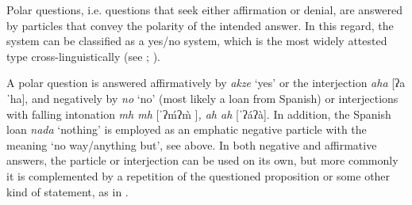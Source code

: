 \documentclass[output=paper,colorlinks,citecolor=brown]{langscibook}
\begin{document}
Polar questions, i.e. questions that seek either affirmation or denial, are answered by particles that convey the polarity of the intended answer. In this regard, the system can be classified as a yes/no system, which is the most widely attested type cross-linguistically (see \citealt{Moser2018}; \citealt{SadockZwicky1985}).

A polar question is answered affirmatively by \textit{akze} ‘yes’ or the interjection \textit{aha} [ʔaˈha], and negatively by \textit{no} ‘no’ (most likely a loan from Spanish) or interjections with falling intonation \textit{mh mh} [ˈʔ\'{m}ʔ\`{m} ]\textit{, ah ah} [ˈʔáʔà]. In addition, the Spanish loan \textit{nada} ‘nothing’ is employed as an emphatic negative particle with the meaning ‘no way/anything but’, see  above. In both negative and affirmative answers, the particle or interjection can be used on its own, but more commonly it is complemented by a repetition of the questioned proposition or some other kind of statement, as in .

\end{document}
